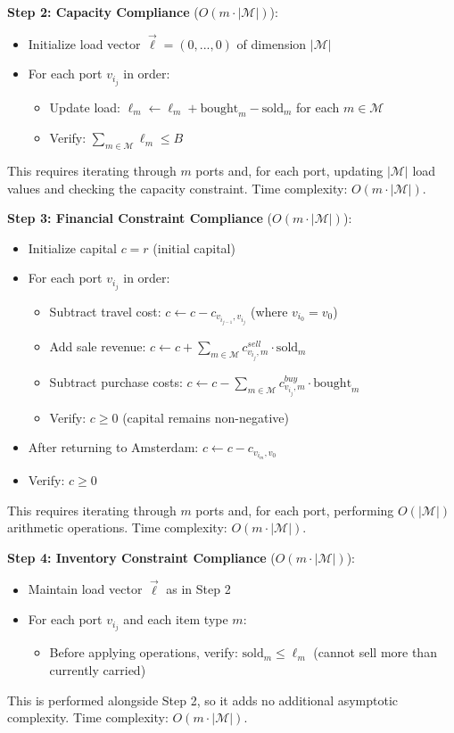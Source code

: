 \documentclass[12pt]{article}
\begin{document}
\textbf{Step 2: Capacity Compliance} ($O(m \cdot |\mathcal{M}|)$):
\begin{itemize}
    \item Initialize load vector $\vec{\ell} = (0, ..., 0)$ of dimension $|\mathcal{M}|$
    \item For each port $v_{i_j}$ in order:
    \begin{itemize}
        \item Update load: $\ell_m \leftarrow \ell_m + \text{bought}_m - \text{sold}_m$ for each $m \in \mathcal{M}$
        \item Verify: $\sum_{m \in \mathcal{M}} \ell_m \leq B$
    \end{itemize}
\end{itemize}
This requires iterating through $m$ ports and, for each port, updating $|\mathcal{M}|$ load values and checking the capacity constraint. Time complexity: $O(m \cdot |\mathcal{M}|)$.

\textbf{Step 3: Financial Constraint Compliance} ($O(m \cdot |\mathcal{M}|)$):
\begin{itemize}
    \item Initialize capital $c = r$ (initial capital)
    \item For each port $v_{i_j}$ in order:
    \begin{itemize}
        \item Subtract travel cost: $c \leftarrow c - c_{v_{i_{j-1}}, v_{i_j}}$ (where $v_{i_0} = v_0$)
        \item Add sale revenue: $c \leftarrow c + \sum_{m \in \mathcal{M}} c^{sell}_{v_{i_j}, m} \cdot \text{sold}_m$
        \item Subtract purchase costs: $c \leftarrow c - \sum_{m \in \mathcal{M}} c^{buy}_{v_{i_j}, m} \cdot \text{bought}_m$
        \item Verify: $c \geq 0$ (capital remains non-negative)
    \end{itemize}
    \item After returning to Amsterdam: $c \leftarrow c - c_{v_{i_m}, v_0}$
    \item Verify: $c \geq 0$
\end{itemize}
This requires iterating through $m$ ports and, for each port, performing $O(|\mathcal{M}|)$ arithmetic operations. Time complexity: $O(m \cdot |\mathcal{M}|)$.

\textbf{Step 4: Inventory Constraint Compliance} ($O(m \cdot |\mathcal{M}|)$):
\begin{itemize}
    \item Maintain load vector $\vec{\ell}$ as in Step 2
    \item For each port $v_{i_j}$ and each item type $m$:
    \begin{itemize}
        \item Before applying operations, verify: $\text{sold}_m \leq \ell_m$ (cannot sell more than currently carried)
    \end{itemize}
\end{itemize}
This is performed alongside Step 2, so it adds no additional asymptotic complexity. Time complexity: $O(m \cdot |\mathcal{M}|)$.
\end{document}
